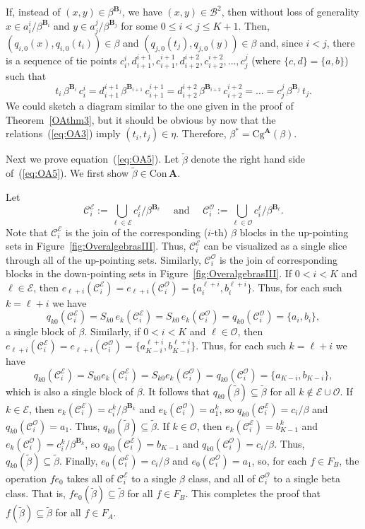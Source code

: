 \documentclass[cm,dissertation]{uhthesis}
\theoremstyle{plain}
\theoremstyle{definition}
\theoremstyle{remark}
\numberwithin{theorem}{section}
\numberwithin{claim}{chapter}
\numberwithin{equation}{section}
\numberwithin{conjecture}{chapter}
\newcommand{\<}{\ensuremath{\langle}}
\renewcommand{\>}{\ensuremath{\rangle}}
\renewcommand{\leq}{\ensuremath{\leqslant}}
\newcommand{\Cg}{\ensuremath{\mathrm{Cg}}}
\newcommand{\Con}{\ensuremath{\mathrm{Con\,}}}
\newcommand{\0}{\ensuremath{\mathbf{0}}}
\newcommand{\1}{\ensuremath{\mathbf{1}}}
\newcommand{\2}{\ensuremath{\mathbf{2}}}
\newcommand{\3}{\ensuremath{\mathbf{3}}}
\newcommand{\4}{\ensuremath{\mathbf{4}}}
\newcommand{\5}{\ensuremath{\mathbf{5}}}
\newcommand{\bA}{\ensuremath{\mathbf{A}}}
\newcommand{\bB}{\ensuremath{\mathbf{B}}}
\newcommand{\sB}{\ensuremath{\mathscr{B}}}
\newcommand{\sC}{\ensuremath{\mathscr{C}}}
\newcommand{\sE}{\ensuremath{\mathscr{E}}}
\newcommand{\sO}{\ensuremath{\mathscr{O}}}
\newcommand{\tbeta}{\ensuremath{\widetilde{\beta}}}
\newcommand{\CE}{\ensuremath{\sC_i^{\sE}}}
\newcommand{\CO}{\ensuremath{\sC_i^{\sO}}}
\begin{document}
If, instead of $(x,y)\in \beta^{\bB_j}$, we have 
$(x,y)\in \sB^2$, then without loss of generality $x\in a_i^i/\beta^{\bB_i}$ and 
$y\in a_j^j/\beta^{\bB_j}$ for some $0\leq i < j \leq K+1$.
Then, %
$(q_{i,0}(x),q_{i,0}(t_i)) \in \beta$ and 
$(q_{j,0}(t_j),q_{j,0}(y)) \in \beta$ and, since $i<j$, there is a sequence of tie points
$c_i^i, d_{i+1}^{i+1}, c_{i+1}^{i+1}, d_{i+2}^{i+2}, c_{i+2}^{i+2}, \dots,
c_j^j$ (where $\{c, d\} = \{a, b\}$) such that
\begin{equation}
  \label{eq:OA3}
  t_i \, \beta^{\bB_i}\, c_i^i = 
  d_{i+1}^{i+1} \, \beta^{\bB_{i+1}}\, c_{i+1}^{i+1} =
  d_{i+2}^{i+2} \, \beta^{\bB_{i+2}}\, c_{i+2}^{i+2}= \dots
  = c_j^j \, \beta^{\bB_{j}} \, t_j.
\end{equation}
We could sketch a diagram similar to the one given in the proof of
Theorem~\ref{OAthm3}, but it should be obvious by now that the relations~(\ref{eq:OA3})
imply $(t_i, t_j) \in \eta$.  Therefore, $\beta^* = \Cg^{\bA}(\beta)$.

Next we prove equation~(\ref{eq:OA5}).  Let $\tbeta$ denote the right hand side
of~(\ref{eq:OA5}).  We first show $\tbeta\in \Con\bA$.

Let 
\[
\CE:= \bigcup_{\ell \in \sE} c_i^\ell/\beta^{\bB_{\ell}} \quad \text{ and }
\quad 
\CO:=\bigcup_{\ell \in \sO} c_i^\ell/\beta^{\bB_{\ell}}.
\]
Note that $\CE$ is the join of the corresponding ($i$-th) $\beta$ blocks in the
up-pointing sets in Figure~\ref{fig:OveralgebrasIII}.  Thus, $\CE$ can be
visualized as a single slice through all of the up-pointing sets.  Similarly,
$\CO$ is the join of corresponding blocks in the down-pointing sets 
in Figure~\ref{fig:OveralgebrasIII}.  
If $0< i< K$ and $\ell \in \sE$, then
$e_{\ell+i}(\CE) = e_{\ell+i}(\CO) = \{a_i^{\ell+i}, b_i^{\ell+i}\}$.
Thus, for each such $k=\ell+i$ we have 
\[
q_{k0}(\CE) = S_{k0}\,e_k(\CE) = S_{k0}\,e_k(\CO) = q_{k0}(\CO)
= \{a_i, b_i\},
\]
a single block of $\beta$.
Similarly, if $0< i< K$ and $\ell \in \sO$, then
$e_{\ell+i}(\CE) = 
e_{\ell+i}(\CO) = \{a_{K-i}^{\ell+i}, b_{K-i}^{\ell+i}\}$.
Thus, for each such $k=\ell+i$ we have 
\[
q_{k0}(\CE) = S_{k0}e_k(\CE) = S_{k0}e_k(\CO) = q_{k0}(\CO)
= \{a_{K-i}, b_{K-i}\},
\]
which is also a single block of $\beta$.  
It follows that $q_{k0}(\tbeta)\subseteq \tbeta$ for all $k\notin \sE \cup \sO$.
If $k\in \sE$, then $e_k(\CE) = c_i^k/\beta^{\bB_k}$
and $e_k(\CO) = a_1^k$, so $q_{k0}(\CE) = c_i/\beta$ and 
$q_{k0}(\CO) = a_1$.  
Thus, $q_{k0}(\tbeta)\subseteq \tbeta$.
If $k\in \sO$, then 
$e_k(\CE) = b_{K-1}^k$ and $e_k(\CO) = c_i^k/\beta^{\bB_k}$,
so $q_{k0}(\CE) = b_{K-1} $ and 
$q_{k0}(\CO)= c_i/\beta$.  Thus, 
$q_{k0}(\tbeta)\subseteq \tbeta$.
Finally, $e_{0}(\CE) = c_i/\beta$ and 
$e_{0}(\CO) = a_1$, so, for each $f\in F_B$, the operation
$fe_{0}$ takes all of $\CE$ to a single $\beta$ class, and all of $\CO$ to a
single beta class.  That is, $fe_0(\tbeta)\subseteq \tbeta$ for all $f\in F_B$.
This completes the proof that $f(\tbeta)\subseteq \tbeta$ for all $f\in F_A$.
\end{document}
